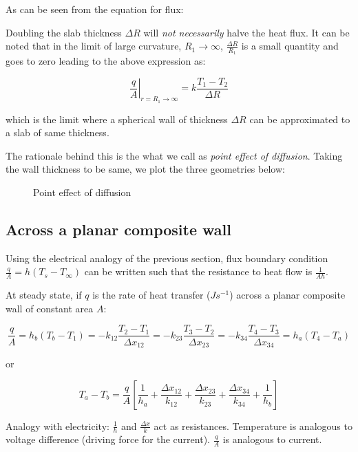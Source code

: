 As can be seen from the equation for flux:

Doubling the slab thickness $\Delta R$ will \textit{not necessarily} halve the
heat flux. It can be noted that in the limit of large curvature, $R_1
\rightarrow \infty$, $\frac{\Delta R}{R_1}$ is a small quantity and goes to zero
leading to the above expression as:

$$\left. \frac{q}{A}\right|_{r=R_1 \rightarrow \infty} = k \frac{T_1 -
T_2}{\Delta R} $$

which is the limit where a spherical wall of thickness $\Delta R$ can be
approximated to a slab of same thickness.

The rationale behind this is the what we call as \textit{point effect of
diffusion}. Taking the wall thickness to be same, we plot the three geometries
below: 

\begin{figure}[h]
\begin{center}
\end{center}
\caption{Point effect of diffusion}
\label{pediff}
\end{figure}


\subsection{Across a planar composite wall}

Using the electrical analogy of the previous section, flux boundary condition
$\frac{q}{A} = h \left(T_s - T_\infty \right)$ can be written such that the
resistance to heat flow is $\frac{1}{Ah}$.

At steady state, if $q$ is the rate of heat transfer ($Js^{-1}$) across a planar
composite wall of constant area $A$:

$$ \frac{q}{A} = h_b \left(T_b - T_1 \right) = 
      -k_{12} \frac{T_2 - T_1}{\Delta x_{12}} = 
      -k_{23} \frac{T_3 - T_2}{\Delta x_{23}} = 
      -k_{34} \frac{T_4 - T_3}{\Delta x_{34}} = 
       h_a \left(T_4 - T_a \right) $$

or

$$ T_a - T_b = \frac{q}{A} \left[ \frac{1}{h_a} + 
                                  \frac{\Delta x_{12}}{k_{12}} +
                                  \frac{\Delta x_{23}}{k_{23}} +
                                  \frac{\Delta x_{34}}{k_{34}} +
                                  \frac{1}{h_b} \right] $$

Analogy with electricity: $\frac{1}{h}$ and $\frac{\Delta x}{k}$ act as
resistances. Temperature is analogous to voltage difference (driving force for
the current). $\frac{q}{A}$ is analogous to current.

